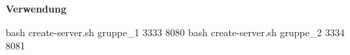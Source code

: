 \documentclass[
  ngerman,
  letterpaper,
  DIV=11]{scrreprt}
\newenvironment{Shaded}{\begin{snugshade}}{\end{snugshade}}
\newcommand{\FunctionTok}[1]{\textcolor[rgb]{0.28,0.35,0.67}{#1}}
\newcommand{\NormalTok}[1]{\textcolor[rgb]{0.00,0.23,0.31}{#1}}
\begin{document}
\textbf{Verwendung}

\begin{Shaded}
\begin{Highlighting}[]
\FunctionTok{bash}\NormalTok{ create{-}server.sh gruppe\_1 3333 8080}
\FunctionTok{bash}\NormalTok{ create{-}server.sh gruppe\_2 3334 8081}
\end{Highlighting}
\end{Shaded}
\end{document}
